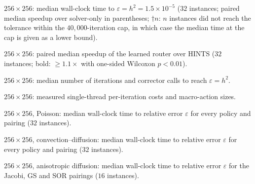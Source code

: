 \begin{table}[H]
\color{red}
\centering
\caption{$256\times256$: median wall-clock time to $\varepsilon = h^2 = 1.5\times10^{-5}$ ($32$ instances; paired median speedup over solver-only in parentheses; $\dagger n$: $n$ instances did not reach the tolerance within the $40{,}000$-iteration cap, in which case the median time at the cap is given as a lower bound).}
\resizebox{\textwidth}{!}{\cawcmainB}
\label{tab:ca_main_256}
\end{table}

\begin{table}[H]
\color{red}
\centering
\caption{$256\times256$: paired median speedup of the learned router over HINTS ($32$ instances; bold: $\ge1.1\times$ with one-sided Wilcoxon $p<0.01$).}
\resizebox{0.95\textwidth}{!}{\cavshintsB}
\label{tab:ca_vshints_256}
\end{table}

\begin{table}[H]
\color{red}
\centering
\caption{$256\times256$: median number of iterations and corrector calls to reach $\varepsilon = h^2$.}
\resizebox{0.8\textwidth}{!}{\causageB}
\label{tab:ca_usage_256}
\end{table}

\begin{table}[H]
\color{red}
\centering
\caption{$256\times256$: measured single-thread per-iteration costs and macro-action sizes.}
\resizebox{0.75\textwidth}{!}{\cacostsB}
\label{tab:ca_costs_256}
\end{table}

\begin{table}[H]
\color{red}
\centering
\caption{$256\times256$, Poisson: median wall-clock time to relative error $\varepsilon$ for every policy and pairing ($32$ instances).}
\resizebox{\textwidth}{!}{\cawctolpoissonB}
\label{tab:ca_tol_poisson_256}
\end{table}

\begin{table}[H]
\color{red}
\centering
\caption{$256\times256$, convection--diffusion: median wall-clock time to relative error $\varepsilon$ for every policy and pairing ($32$ instances).}
\resizebox{\textwidth}{!}{\cawctolconvB}
\label{tab:ca_tol_convdiff_256}
\end{table}

\begin{table}[H]
\color{red}
\centering
\caption{$256\times256$, anisotropic diffusion: median wall-clock time to relative error $\varepsilon$ for the Jacobi, GS and SOR pairings ($16$ instances).}
\resizebox{\textwidth}{!}{\cawctolanisoB}
\label{tab:ca_tol_aniso_256}
\end{table}

